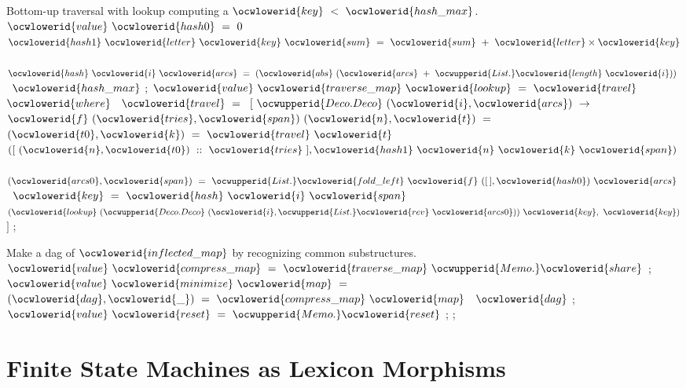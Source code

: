 \documentclass[12pt]{article}
\begin{document}
\ocwendcode{}\ocwindent{0.00em}
Bottom-up traversal with lookup computing a \ocwbegindcode{}$\ocwlowerid{key}~<~\ocwlowerid{hash\_max}$\ocwenddcode{}. 
\ocweol
\label{../ML/minimap.ml:1264}%
\medskip
\ocwbegincode{}\ocwindent{0.00em}
$\ocwlowerid{value}~\ocwlowerid{hash0}~=~0$\ocweol
\ocwindent{0.00em}
~$\ocwlowerid{hash1}~\ocwlowerid{letter}~\ocwlowerid{key}~\ocwlowerid{sum}~=~\ocwlowerid{sum}~+~\ocwlowerid{letter}\times{}\ocwlowerid{key}$\ocweol
\ocwindent{0.00em}
~$\ocwlowerid{hash}~\ocwlowerid{i}~\ocwlowerid{arcs}~=~(\ocwlowerid{abs}~(\ocwlowerid{arcs}~+~\ocwupperid{List.}\ocwlowerid{length}~\ocwlowerid{i}))~$~$\ocwlowerid{hash\_max}$\ocweol
\ocwindent{0.00em}
;\ocweol
\ocwindent{0.00em}
$\ocwlowerid{value}~\ocwlowerid{traverse\_map}~\ocwlowerid{lookup}~=~\ocwlowerid{travel}~$\ocweol
\ocwindent{0.50em}
$\ocwlowerid{where}~$~$\ocwlowerid{travel}~=~$\ocweol
\ocwindent{1.00em}
$[~\ocwupperid{Deco.Deco}~(\ocwlowerid{i},\ocwlowerid{arcs})~\rightarrow{}$\ocweol
\ocwindent{2.00em}
~$\ocwlowerid{f}~(\ocwlowerid{tries},\ocwlowerid{span})~(\ocwlowerid{n},\ocwlowerid{t})~=~$\ocweol
\ocwindent{3.50em}
~$(\ocwlowerid{t0},\ocwlowerid{k})~=~\ocwlowerid{travel}~\ocwlowerid{t}~$\ocweol
\ocwindent{3.50em}
$([~(\ocwlowerid{n},\ocwlowerid{t0})~::~\ocwlowerid{tries}~],\ocwlowerid{hash1}~\ocwlowerid{n}~\ocwlowerid{k}~\ocwlowerid{span})~$\ocweol
\ocwindent{2.00em}
~$(\ocwlowerid{arcs0},\ocwlowerid{span})~=~\ocwupperid{List.}\ocwlowerid{fold\_left}~\ocwlowerid{f}~([\,],\ocwlowerid{hash0})~\ocwlowerid{arcs}~$\ocweol
\ocwindent{2.00em}
~$\ocwlowerid{key}~=~\ocwlowerid{hash}~\ocwlowerid{i}~\ocwlowerid{span}~$\ocweol
\ocwindent{2.00em}
$(\ocwlowerid{lookup}~(\ocwupperid{Deco.Deco}~(\ocwlowerid{i},\ocwupperid{List.}\ocwlowerid{rev}~\ocwlowerid{arcs0}))~\ocwlowerid{key},~\ocwlowerid{key})$\ocweol
\ocwindent{1.00em}
$]$\ocweol
\ocwindent{0.00em}
;\medskip

\ocwendcode{}\ocwindent{0.00em}
Make a dag of \ocwbegindcode{}$\ocwlowerid{inflected\_map}$\ocwenddcode{} by recognizing common substructures. 
\ocweol
\label{../ML/minimap.ml:1877}%
\medskip
\ocwbegincode{}\ocwindent{0.00em}
$\ocwlowerid{value}~\ocwlowerid{compress\_map}~=~\ocwlowerid{traverse\_map}~\ocwupperid{Memo.}\ocwlowerid{share}$\ocweol
\ocwindent{0.00em}
;\ocweol
\ocwindent{0.00em}
$\ocwlowerid{value}~\ocwlowerid{minimize}~\ocwlowerid{map}~=~$~$(\ocwlowerid{dag},\ocwlowerid{\_})~=~\ocwlowerid{compress\_map}~\ocwlowerid{map}~$~$\ocwlowerid{dag}$\ocweol
\ocwindent{0.00em}
;\ocweol
\ocwindent{0.00em}
$\ocwlowerid{value}~\ocwlowerid{reset}~=~\ocwupperid{Memo.}\ocwlowerid{reset}$\ocweol
\ocwindent{0.00em}
;\ocweol
\ocwindent{0.00em}
;\ocweol
\ocweol
\ocwendcode{}\section{Finite State Machines as Lexicon Morphisms}
\end{document}
